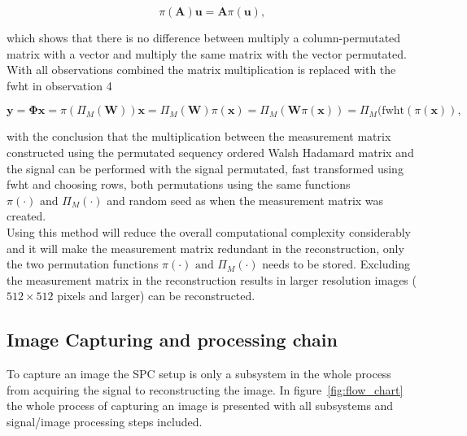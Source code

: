 \begin{equation}
\pi(\mathbf{A})\mathbf{u} = \mathbf{A}\pi(\mathbf{u})\text{,}
\end{equation}

which shows that there is no difference between multiply a column-permutated matrix with a vector and multiply the same matrix with the vector permutated.\\[0.1in]

With all observations combined the matrix multiplication is replaced with the fwht in observation 4

\begin{equation}
\mathbf{y} = \mathbf{\Phi}\mathbf{x} = \pi(\Pi_M(\mathbf{W}))\mathbf{x} = \Pi_M(\mathbf{W})\pi(\mathbf{x}) = \Pi_M(\mathbf{W}\pi(\mathbf{x})) = \Pi_M(\text{fwht}(\pi(\mathbf{x}))\text{,}
\end{equation}

with the conclusion that the multiplication between the measurement matrix constructed using the permutated sequency ordered Walsh Hadamard matrix and the signal can be performed with the signal permutated, fast transformed using fwht and choosing rows, both permutations using the same functions $\pi(\cdot) \text{ and } \Pi_M(\cdot)$ and random seed as when the measurement matrix was created.\\[0.1in]

Using this method will reduce the overall computational complexity considerably and it will make the measurement matrix redundant in the reconstruction, only the two permutation functions $\pi(\cdot) \text{ and } \Pi_M(\cdot)$ needs to be stored. Excluding the measurement matrix in the reconstruction results in larger resolution images ($512\times512$ pixels and larger) can be reconstructed. \cite{article:SRM_long, article:TVAL3}



\subsection{Image Capturing and processing chain}
To capture an image the SPC setup is only a subsystem in the whole process from acquiring the signal to reconstructing the image. In figure~\ref{fig:flow_chart} the whole process of capturing an image is presented with all subsystems and signal/image processing steps included.

